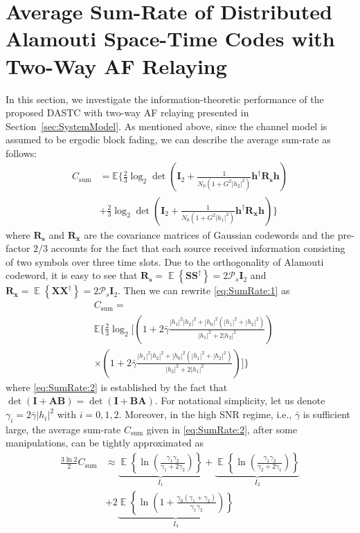 \documentclass[conference]{IEEEtran}
\DeclareMathOperator{\E}{\mathbb{E}}
\newcommand{\B}[1]{{\pmb{#1}}}
\newcommand{\EX}[1]{\E\left\{{#1}\right\}}
\newcommand{\Rsum}{C_{\text{sum}}}
\newcommand{\Ps}{\mathcal{P}_s}
\newcommand{\h}[1]{h_{#1}}
\newcommand{\hnew}{\B{h}}
\newcommand{\snri}[1]{\gamma_{#1}}
\newcommand{\Gain}{G}
\newcommand{\snrave}{\bar\gamma}
\newcommand{\R}[1]{\B{R}_{#1}}
\begin{document}
\section{Average Sum-Rate of Distributed Alamouti Space-Time Codes with Two-Way AF Relaying} \label{sec:SumRate}

In this section, we investigate the information-theoretic
performance of the proposed DASTC with two-way AF relaying presented
in Section~\ref{sec:SystemModel}. As mentioned above, since the
channel model is assumed to be ergodic block fading, we can describe
the average sum-rate as follows:
%
%
\begin{align} \label{eq:SumRate:1}
    \Rsum
    &=
    \mathbb{E}
    \biggl\{
    \frac{2}{3}\log_2\det\left(\B{I}_2 + \frac{1}{N_0\left(1+\Gain^2 |\h{2}|^2\right)} \hnew^{\dag}\R{\B{s}}\hnew \right)
    \nonumber
    \\
    &+
    \frac{2}{3}\log_2\det\left(\B{I}_2 + \frac{1}{N_0\left(1+ \Gain^2 |\h{1}|^2\right)} \hnew^{\dag}\R{\B{x}}\hnew \right)
    \biggr\}
\end{align}
%
%
where $\R{\B{s}}$ and $\R{\B{x}}$ are the covariance matrices of
Gaussian codewords and the pre-factor $2/3$ accounts for the fact
that each source received information consisting of two symbols over
three time slots. Due to the orthogonality of Alamouti codeword, it
is easy to see that $\R{\B{s}} = \EX{\B{S} \B{S}^{\dag}} = 2\Ps
\B{I}_2$ and $\R{\B{x}} = \EX{\B{X} \B{X}^{\dag}} = 2\Ps \B{I}_2$.
Then we can rewrite \eqref{eq:SumRate:1} as
%
%
\begin{align} \label{eq:SumRate:2}
    &\Rsum
    =
    \nonumber
    \\
    &
    \mathbb{E}
    \biggl\{
    \frac{2}{3}\log_2
    \biggl[
    \left(1+2\snrave\frac{|\h{1}|^2 |\h{2}|^2+|\h{0}|^2\left(|\h{1}|^2 + |\h{2}|^2\right)}{|\h{1}|^2 + 2|\h{2}|^2}\right)
    \nonumber
    \\
    &\times
    \left(1+2\snrave\frac{|\h{1}|^2 |\h{2}|^2+|\h{0}|^2\left(|\h{1}|^2 + |\h{2}|^2\right)}{|\h{2}|^2 + 2|\h{1}|^2}\right)
    \biggr]
    \biggr\}
\end{align}
%
%
where \eqref{eq:SumRate:2} is established by the fact that
$\det\left(\B{I} + \B{A} \B{B}\right)=\det\left(\B{I} + \B{B}
\B{A}\right)$. For notational simplicity, let us denote
$\snri{i}=2\snrave|\h{i}|^2$ with $i=0,1,2$. Moreover, in the high
SNR regime, i.e., $\snrave$ is sufficient large, the average
sum-rate $\Rsum$ given in \eqref{eq:SumRate:2}, after some
manipulations, can be tightly approximated as
%
%
\begin{align} \label{eq:SumRate:3}
    \frac{3 \ln2}{2}
    \Rsum
    &\approx
    \underbrace
    {
    \EX{\ln\left(\frac{\snri{1}\snri{2}}{\snri{1}+2\snri{2}}\right)}
    }_{I_1}
    +
    \underbrace
    {
    \EX{\ln\left(\frac{\snri{1}\snri{2}}{\snri{2}+2\snri{1}}\right)}
    }_{I_2}
    \nonumber
    \\
    &+
    2
    \underbrace
    {
    \EX{\ln\left(1+\frac{\snri{0}\left(\snri{1}+\snri{2}\right)}{\snri{1}\snri{2}}\right)}
    }_{I_3}
\end{align}
\end{document}

